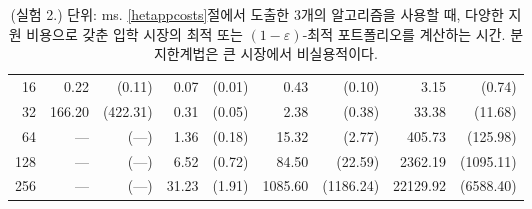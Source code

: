 \documentclass[11pt]{article} %
\newif\ifen
\theoremstyle{definition}
\theoremstyle{definition}
\begin{document}
\begin{table}[h!]
\begin{tabular}{r|r@{~}r|r@{~}r|r@{~}r|r@{~}r}
    16 &          0.22 &       (0.11) &         0.07 &      (0.01) &                0.43 &             (0.10) &                 3.15 &              (0.74) \\
    32 &        166.20 &     (422.31) &         0.31 &      (0.05) &                2.38 &             (0.38) &                33.38 &             (11.68) \\
    64 &             — &          (—) &         1.36 &      (0.18) &               15.32 &             (2.77) &               405.73 &            (125.98) \\
   128 &             — &          (—) &         6.52 &      (0.72) &               84.50 &            (22.59) &              2362.19 &           (1095.11) \\
   256 &             — &          (—) &        31.23 &      (1.91) &             1085.60 &          (1186.24) &             22129.92 &           (6588.40)
\end{tabular}%
\caption{\label{experiment2results} \normalsize
\ifen (Experiment 2.) Time in ms to compute an optimal or $(1 - \varepsilon)$-optimal portfolio for an admissions market with heterogeneous application costs using the three algorithms developed in Section \ref{hetappcosts}.
The branch-and-bound algorithm is impractical for large markets. \lastptofcaption
\else  %
(실험 2.) 단위: ms. \ref{hetappcosts}절에서 도출한 3개의 알고리즘을 사용할 때, 다양한 지원 비용으로 갖춘 입학 시장의 최적 또는 $(1- \varepsilon)$-최적 포트폴리오를 계산하는 시간. 분지한계법은 큰 시장에서 비실용적이다. \lastptofcaption \fi}
\end{table}
\end{document}
